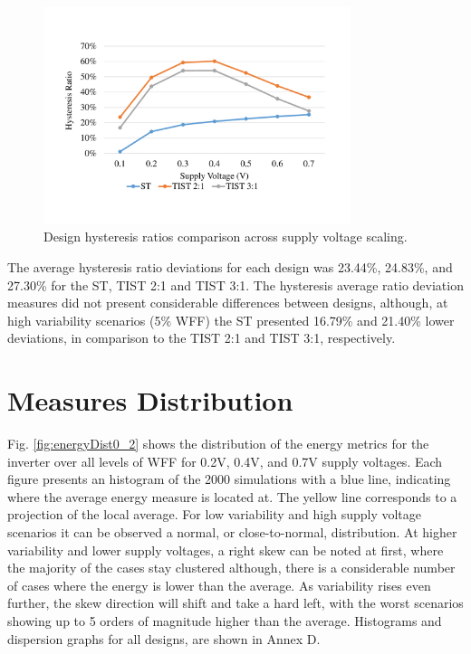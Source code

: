 \documentclass[pgmicro,diss,english]{iiufrgs}
\begin{document}
    \begin{figure}[H]
        \centering
            \includegraphics[width=0.8\textwidth, trim={2cm 3cm 2cm 3cm}, clip]{hystRatiosVdd.pdf}
            \caption{Design hysteresis ratios comparison across supply voltage scaling.}
        \label{fig:hystRatiosVdd}
    \end{figure}

    The average hysteresis ratio deviations for each design was 23.44\%, 24.83\%, and 27.30\% for the ST, TIST 2:1 and TIST 3:1. The hysteresis average ratio deviation measures did not present considerable differences between designs, although, at high variability scenarios (5\% WFF) the ST presented 16.79\% and 21.40\% lower deviations, in comparison to the TIST 2:1 and TIST 3:1, respectively.

\newpage
\section{Measures Distribution}

    Fig. \ref{fig:energyDist0_2} shows the distribution of the energy metrics for the inverter over all levels of WFF for 0.2V, 0.4V, and 0.7V supply voltages. Each figure presents an histogram of the 2000 simulations with a blue line, indicating where the average energy measure is located at. The yellow line corresponds to a projection of the local average. For low variability and high supply voltage scenarios it can be observed a normal, or close-to-normal, distribution. At higher variability and lower supply voltages, a right skew can be noted at first, where the majority of the cases stay clustered although, there is a considerable number of cases where the energy is lower than the average. As variability rises even further, the skew direction will shift and take a hard left, with the worst scenarios showing up to 5 orders of magnitude higher than the average. Histograms and dispersion graphs for all designs, are shown in Annex D.
\end{document}
